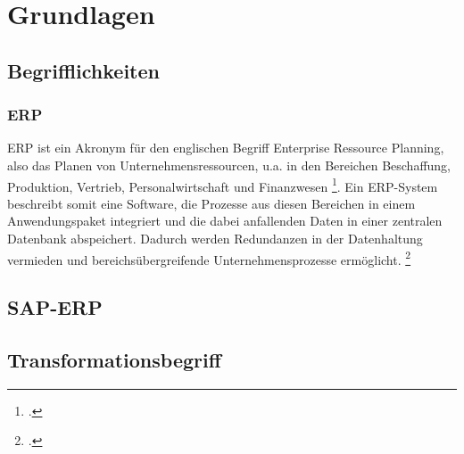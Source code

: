 \section{Grundlagen}
\subsection{Begrifflichkeiten}
\subsubsection{ERP}
ERP ist ein Akronym für den englischen Begriff \glqq{}Enterprise Ressource Planning\grqq{}, also das Planen von Unternehmensressourcen, u.a. in den Bereichen Beschaffung, Produktion, Vertrieb, Personalwirtschaft und Finanzwesen \footcite[Vgl.][523]{wibuch}. Ein ERP-System beschreibt somit eine Software, die Prozesse aus diesen Bereichen in einem Anwendungspaket integriert und die dabei anfallenden Daten in einer zentralen Datenbank abspeichert. Dadurch werden Redundanzen in der Datenhaltung vermieden und bereichsübergreifende Unternehmensprozesse ermöglicht. \footcite[Vgl.][523]{wibuch}

\subsection{SAP-ERP}
\subsection{Transformationsbegriff}
